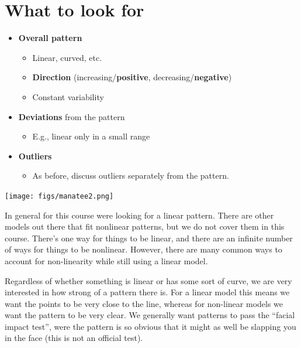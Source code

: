 \documentclass[
  letterpaper,
  DIV=11,
  numbers=noendperiod]{scrreprt}
\providecommand{\tightlist}{%
  \setlength{\itemsep}{0pt}\setlength{\parskip}{0pt}}\usepackage{longtable,booktabs,array}
\begin{document}
\hypertarget{what-to-look-for}{%
\section{What to look for}\label{what-to-look-for}}

\pspace

\begin{itemize}
\tightlist
\item
  \textbf{Overall pattern}

  \begin{itemize}
  \tightlist
  \item
    Linear, curved, etc.
  \item
    \textbf{Direction} (increasing/\textbf{positive},
    decreasing/\textbf{negative})
  \item
    Constant variability\lspace
  \end{itemize}
\item
  \textbf{Deviations} from the pattern

  \begin{itemize}
  \tightlist
  \item
    E.g., linear only in a small range\lspace
  \end{itemize}
\item
  \textbf{Outliers}

  \begin{itemize}
  \tightlist
  \item
    As before, discuss outliers separately from the pattern.
  \end{itemize}
\end{itemize}

\texttt{[image: figs/manatee2.png]}

In general for this course were looking for a linear pattern. There are
other models out there that fit nonlinear patterns, but we do not cover
them in this course. There's one way for things to be linear, and there
are an infinite number of ways for things to be nonlinear. However,
there are many common ways to account for non-linearity while still
using a linear model.

Regardless of whether something is linear or has some sort of curve, we
are very interested in how strong of a pattern there is. For a linear
model this means we want the points to be very close to the line,
whereas for non-linear models we want the pattern to be very clear. We
generally want patterns to pass the ``facial impact test'', were the
pattern is so obvious that it might as well be slapping you in the face
(this is not an official test).
\end{document}
